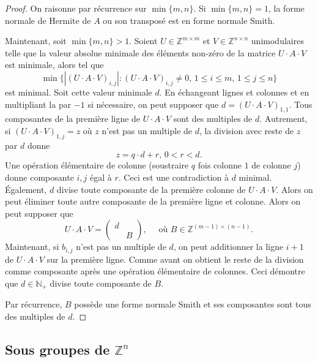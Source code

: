 \begin{proof}
  On raisonne par récurrence sur $\min\{m,n\}$. Si $\min\{m,n\}=1$, la forme normale de Hermite de $A$ ou son transposé est en forme normale Smith.

  Maintenant, soit  $\min\{m,n\}>1$. Soient  $ U \in \mathbb{Z}^{m\times m}$ et $V \in
  \mathbb{Z}^{n\times n}$ unimodulaires telle que la valeur absolue minimale des éléments non-zéro de la matrice $U⋅A ⋅V$ est minimale, alors tel que
  \begin{displaymath}
    \min\{ | (U⋅A ⋅V )_{i,j} | : (U⋅A ⋅V )_{i,j} ≠ 0, \, 1≤ i ≤ m, \, 1 ≤ j ≤ n\} 
  \end{displaymath} est minimal. 
  Soit cette valeur minimale  $d$. En échangeant  lignes et colonnes et en multipliant la  par $-1$ si nécessaire, on peut supposer que $d  = (U⋅A ⋅V )_{1,1}$.
  Tous composantes de la première  ligne de $U⋅A ⋅V$ sont des multiples de $d$. Autrement, si $(U⋅A ⋅V )_{1,j} = z$ où $z$ n'est pas un multiple de $d$, la division avec reste de $z$ par $d$ donne 
  \begin{displaymath}
    z = q ⋅ d + r, \, 0 < r < d. 
  \end{displaymath}
  Une opération élémentaire de colonne (soustraire $q$ fois colonne $1$ de colonne $j$) donne composante $i,j$ égal à $r$. Ceci est une contradiction à $d$ minimal. Également, $d$ divise toute composante de la première colonne de  $U⋅A ⋅V$. Alors on peut éliminer toute autre composante de la première ligne et colonne. Alors on peut supposer que
  \begin{equation}
      U⋅A ⋅V  =
      \begin{pmatrix}
        d & \\ 
          & B 
      \end{pmatrix}, \quad \text{ où }  B ∈ ℤ^{(m-1 ) × (n-1)}.  
    \end{equation}
    Maintenant, si $b_{i,j}$ n'est pas un multiple de $d$, on peut
    additionner la ligne $i+1$ de $U⋅A ⋅V$ sur la première
    ligne. Comme avant on obtient le reste de la division comme
    composante après une opération élémentaire de colonnes. Ceci
    démontre que $d ∈ ℕ_+$ divise toute composante de $B$.

    Par récurrence, $B$ possède une forme normale Smith et ses composantes sont tous des multiples de $d$. 
  
\end{proof} 


\subsection*{Sous groupes de $ℤ^n$} 
\label{sec:sous-groupes-de}

